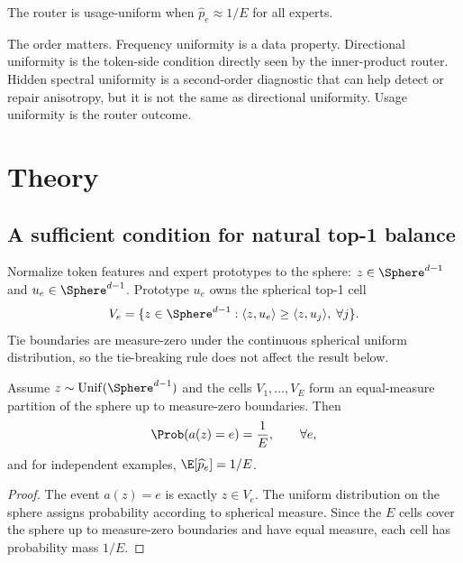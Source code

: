 \begin{definition}
The router is usage-uniform when $\widehat p_e\approx 1/E$ for all experts.
\end{definition}

The order matters. Frequency uniformity is a data property. Directional
uniformity is the token-side condition directly seen by the inner-product
router. Hidden spectral uniformity is a second-order diagnostic that can help
detect or repair anisotropy, but it is not the same as directional uniformity.
Usage uniformity is the router outcome.

\section{Theory}

\subsection{A sufficient condition for natural top-1 balance}

Normalize token features and expert prototypes to the sphere:
$z\in\Sphere^{d-1}$ and $u_e\in\Sphere^{d-1}$. Prototype $u_e$ owns the
spherical top-1 cell
\begin{equation}
 V_e=\{z\in\Sphere^{d-1}:\langle z,u_e\rangle\ge
 \langle z,u_j\rangle,\;\forall j\}.
\end{equation}
Tie boundaries are measure-zero under the continuous spherical uniform
distribution, so the tie-breaking rule does not affect the result below.

\begin{proposition}
\label{prop:equal_measure_cells}
Assume $z\sim\mathrm{Unif}(\Sphere^{d-1})$ and the cells $V_1,\ldots,V_E$ form
an equal-measure partition of the sphere up to measure-zero boundaries. Then
\begin{equation}
 \Prob(a(z)=e)=\frac{1}{E},\qquad \forall e,
\end{equation}
and for independent examples, $\E[\widehat p_e]=1/E$.
\end{proposition}

\begin{proof}
The event $a(z)=e$ is exactly $z\in V_e$. The uniform distribution on the sphere
assigns probability according to spherical measure. Since the $E$ cells cover
the sphere up to measure-zero boundaries and have equal measure, each cell has
probability mass $1/E$.
\end{proof}

